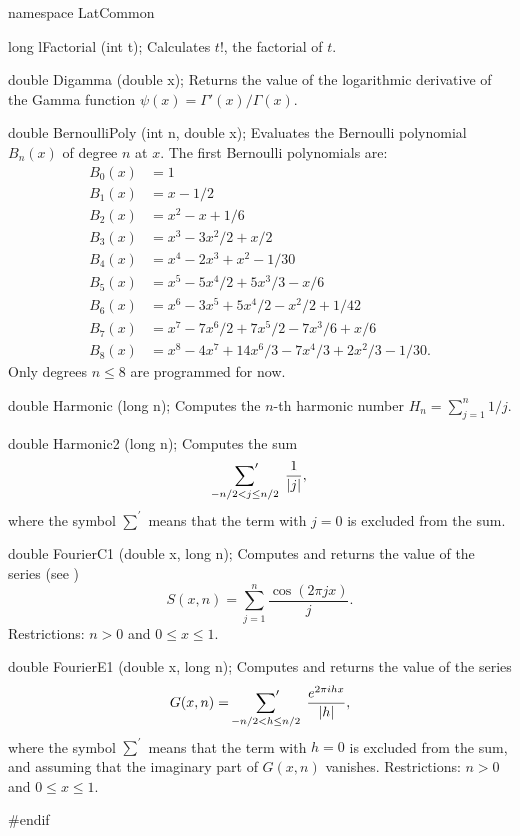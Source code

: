 namespace LatCommon {

long lFactorial (int t);
\endcode
\tab
Calculates $t!$, the factorial of $t$.
\endtab
\code

double Digamma (double x);
\endcode
\tab Returns the value of the logarithmic derivative of the Gamma function
   $\psi(x) = \Gamma'(x) / \Gamma(x)$.
\endtab
\code

double BernoulliPoly (int n, double x);
\endcode
\tab Evaluates the Bernoulli polynomial $B_n(x)$ of degree $n$
  at $x$.
 The first Bernoulli polynomials are:
\begin{align}
B_0(x) &= 1 \nonumber \\
B_1(x) &= x - 1/2 \nonumber \\
B_2(x) &= x^2-x+1/6 \nonumber \\
B_3(x) &= x^3 - 3x^2/2 + x/2 \nonumber \\
B_4(x) &= x^4-2x^3+x^2-1/30 \label{bernoullipol}\\
B_5(x) &= x^5 - 5x^4/2 + 5x^3/3 - x/6 \nonumber \\
B_6(x) &= x^6-3x^5+5x^4/2-x^2/2+1/42 \nonumber \\
B_7(x) &= x^7 - 7x^6/2 +  7x^5/2 - 7x^3/6 + x/6 \nonumber \\
B_8(x) &= x^8-4x^7+14x^6/3 - 7x^4/3 +2x^2/3-1/30. \nonumber
\end{align}
Only degrees $n \le 8$ are programmed for now.
\endtab
\code

double Harmonic (long n);
\endcode
\tab Computes the $n$-th harmonic number $H_n  = \sum_{j=1}^n 1/j$.
\endtab
\code

double Harmonic2 (long n);
\endcode
\tab Computes the sum
\[
\sideset{}{'}\sum_{-n/2<j\le n/2}\; \frac 1{|j|},
\]
 where the symbol $\sum^\prime$ means that the term with $j=0$ is excluded
 from the sum.
\endtab
\code

double FourierC1 (double x, long n);
\endcode
\tab Computes and returns the value of the series (see \cite{vJOE92b})
\[
S(x, n) = \sum_{j=1}^{n} \frac{\cos(2\pi j x)}{j}.
\]
Restrictions: $n>0$ and $0 \le x \le 1$.
\endtab
\code

double FourierE1 (double x, long n);
\endcode
\tab Computes and returns the value of the series
\[
G(x, n) = \sideset{}{'}\sum_{-n/2<h\le n/2}\;  \frac{e^{2\pi i h x}}{|h|},
\]
 where the symbol $\sum^\prime$ means that the term with $h=0$ is excluded
 from the sum, and assuming that the imaginary part of $G(x, n)$ vanishes.
 Restrictions: $n>0$ and $0 \le x \le 1$.
\endtab
\code
}
\hide
#endif
\endhide
\endcode
